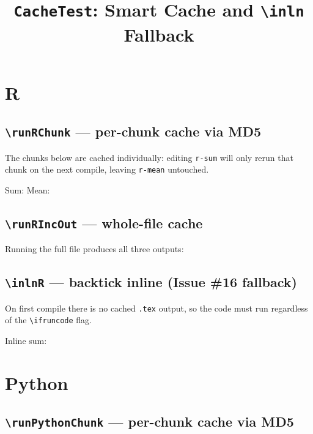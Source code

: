 \documentclass[12pt]{article}
\begin{document}
\title{\texttt{CacheTest}: Smart Cache and \texttt{{\textbackslash}inln} Fallback}
\date{}
\maketitle

\section{R}

\subsection{\texttt{\textbackslash runRChunk} — per-chunk cache via MD5}

The chunks below are cached individually: editing \texttt{r-sum} will only
rerun that chunk on the next compile, leaving \texttt{r-mean} untouched.

Sum:  
Mean: 

\subsection{\texttt{\textbackslash runRIncOut} — whole-file cache}

Running the full file produces all three outputs:


\subsection{\texttt{\textbackslash inlnR} — backtick inline (Issue \#16 fallback)}

On first compile there is no cached \texttt{.tex} output, so the code must run
regardless of the \texttt{\textbackslash ifruncode} flag.

Inline sum: 

\section{Python}

\subsection{\texttt{\textbackslash runPythonChunk} — per-chunk cache via MD5}
\end{document}
